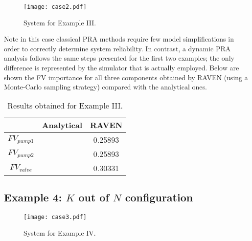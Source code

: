 \begin{figure}
    \centering
    \centerline{\texttt{[image: case2.pdf]}}
    \caption{System for Example III.}
    \label{fig:example3}
\end{figure}

Note in this case classical PRA methods require few model simplifications in order to correctly 
determine system reliability.
In contrast, a dynamic PRA analysis follows the same steps presented for the first two examples; 
the only difference is represented by the simulator that is actually employed.
Below are shown the FV importance for all three components obtained by RAVEN (using a Monte-Carlo 
sampling strategy) compared with the analytical ones.

\begin{table}
  \caption{Results obtained for Example III.} 
  \centering 
  \begin{tabular}{c | c | c } 
    \hline 
     & Analytical & RAVEN \\ 
    \hline 
    $FV_{pump1}$ &   & 0.25893  \\
    $FV_{pump2}$ &   & 0.25893   \\
    $FV_{valve}$ &   & 0.30331   \\
    \hline 
  \end{tabular}
  \label{tab:example3} 
\end{table}

\subsection{Example 4: $K$ out of $N$ configuration}
\label{sec:example4}

\begin{figure}
    \centering
    \centerline{\texttt{[image: case3.pdf]}}
    \caption{System for Example IV.}
    \label{fig:example4}
\end{figure}
